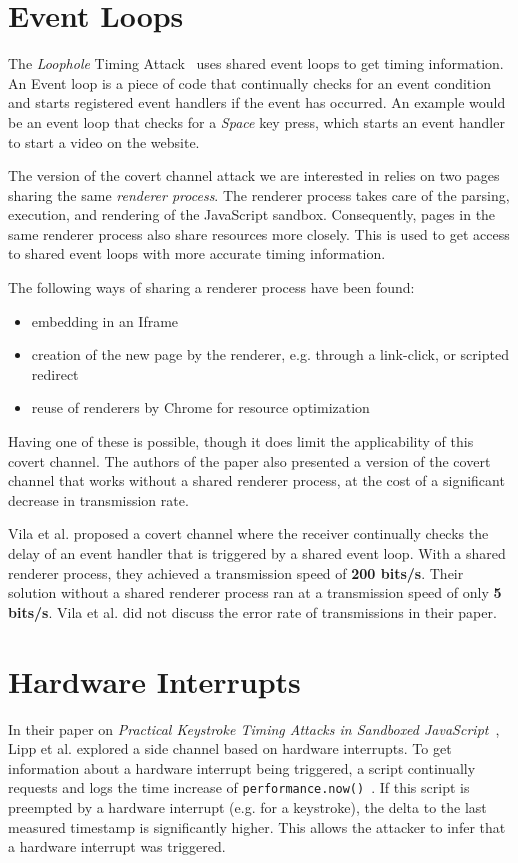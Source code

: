 \documentclass[11pt,
  titlepage=false,
  parskip=half,      %
]{scrreprt}
\begin{document}
\section{Event Loops}
The \textit{Loophole} Timing Attack~\cite{vila2017loophole} uses shared event loops to get timing information.
An Event loop is a piece of code that continually checks for an event condition
and starts registered event handlers if the event has occurred.
An example would be an event loop that checks for a \textit{Space} key press,
which starts an event handler to start a video on the website.

The version of the covert channel attack we are interested in relies on two pages sharing the same \textit{renderer process}.
The renderer process takes care of the parsing, execution, and rendering of the JavaScript sandbox.
Consequently, pages in the same renderer process also share resources more closely.
This is used to get access to shared event loops with more accurate timing information.

The following ways of sharing a renderer process have been found:

\begin{itemize}
    \item embedding in an Iframe
    \item creation of the new page by the renderer, e.g. through a link-click, or scripted redirect
    \item reuse of renderers by Chrome for resource optimization
\end{itemize}

Having one of these is possible, though it does limit the applicability of this covert channel.
The authors of the paper also presented a version of the covert channel that works without a shared renderer process,
at the cost of a significant decrease in transmission rate.

Vila et al. proposed a covert channel where the receiver continually checks the delay of an event handler
that is triggered by a shared event loop.
With a shared renderer process, they achieved a transmission speed of \textbf{200 bits/s}.
Their solution without a shared renderer process ran at a transmission speed of only \textbf{5 bits/s}.
Vila et al. did not discuss the error rate of transmissions in their paper.

\section{Hardware Interrupts}
In their paper on \textit{Practical Keystroke Timing Attacks in Sandboxed JavaScript}~\cite{lipp2017practical},
Lipp et al. explored a side channel based on hardware interrupts.
To get information about a hardware interrupt being triggered,
a script continually requests and logs the time increase of \texttt{performance.now()}~\cite{performancenow}.
If this script is preempted by a hardware interrupt (e.g. for a keystroke),
the delta to the last measured timestamp is significantly higher.
This allows the attacker to infer that a hardware interrupt was triggered.
\end{document}

